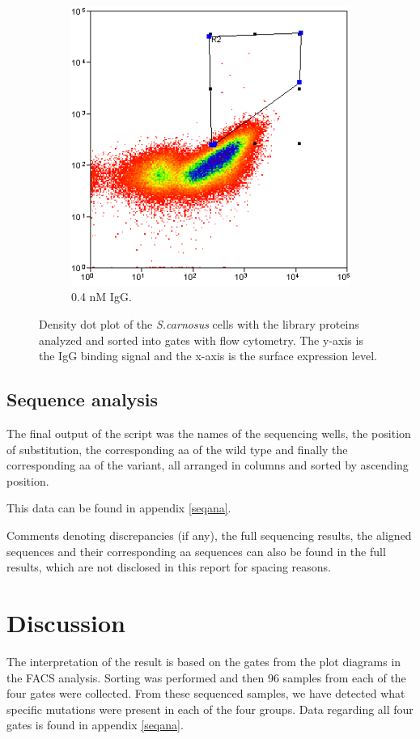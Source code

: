 \documentclass{article}
\begin{document}
\begin{multicols}{2}
\begin{figure}[H]
		\begin{subfigure}{0.8\linewidth}
			\includegraphics[width=\linewidth]{images/gate_1.png}
			\caption{0.4 nM IgG.}
		\end{subfigure}
		\caption{Density dot plot of the \textit{S.carnosus} cells with the library proteins analyzed and sorted into gates with flow cytometry. The y-axis is the IgG binding signal and the x-axis is the surface expression level.}
	\end{figure}

	\subsection{Sequence analysis}
	The final output of the script was the names of the sequencing wells, the position of substitution, the corresponding aa of the wild type and finally the corresponding aa of the variant, all arranged in columns and sorted by ascending position.
	
	This data can be found in appendix \ref{seqana}.
	
	Comments denoting discrepancies (if any), the full sequencing results, the aligned sequences and their corresponding aa sequences can also be found in the full results, which are not disclosed in this report for spacing reasons.
	
	\section{Discussion}
	The interpretation of the result is based on the gates from the plot diagrams in the FACS analysis. Sorting was performed and then 96 samples from each of the four gates were collected. From these sequenced samples, we have detected what specific mutations were present in each of the four groups. Data regarding all four gates is found in appendix \ref{seqana}.
	

\end{multicols}
\end{document}
